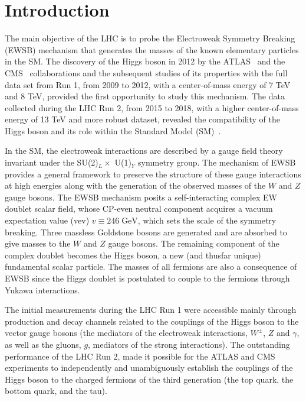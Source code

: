 \documentclass[12pt]{article}
\begin{document}
\section{Introduction}


The main objective of the LHC is to probe the Electroweak Symmetry Breaking (EWSB) mechanism that generates the masses of the known elementary particles in the SM. The discovery of the Higgs boson in 2012 by the ATLAS~\cite{ATLAS:2012yve} and the CMS~\cite{CMS:2012qbp} collaborations and the subsequent studies of its properties with the full data set from Run 1, from 2009 to 2012, with a center-of-mass energy of 7 TeV and 8 TeV, provided the first opportunity to study this mechanism. The data collected during the LHC Run 2, from 2015 to 2018, with a higher center-of-mass energy of 13 TeV and more robust dataset, revealed the compatibility of the Higgs boson and its role within the Standard Model (SM)~\cite{Glashow:1961tr,PhysRevLett.19.1264,PhysRevD.2.1285}.

In the SM, the electroweak interactions are described by a gauge field theory invariant under the SU(2)$_L\times$ U(1)$_Y$ symmetry group. The mechanism of EWSB~\cite{PhysRevLett.13.321,PhysRev.145.1156} provides a general framework to preserve the structure of these gauge interactions at high energies along with the generation of the observed masses of the $W$ and $Z$ gauge bosons. The EWSB mechanism posits a self-interacting complex EW doublet scalar field, whose CP-even neutral component acquires a vacuum expectation value (vev) $v \equiv 246 \;\text{GeV}$, which sets the scale of the symmetry breaking. Three massless Goldstone bosons are generated and are absorbed to give masses to the $W$ and $Z$ gauge bosons. The remaining component of the complex doublet becomes the Higgs boson, a new (and thusfar unique) fundamental scalar particle. The masses of all fermions are also a consequence of EWSB since the Higgs doublet is postulated to couple to the fermions through Yukawa interactions.

The initial measurements during the LHC Run 1 were accessible mainly through production and decay channels related to the couplings of the Higgs boson to the vector gauge bosons (the mediators of the electroweak interactions, $W^\pm$, $Z$ and $\gamma$, as well as the gluons, $g$, mediators of the strong interactions). The outstanding performance of the LHC Run 2, made it possible for the ATLAS and CMS experiments to independently and unambiguously establish the couplings of the Higgs boson to the charged fermions of the third generation (the top quark, the bottom quark, and the tau).
\end{document}
